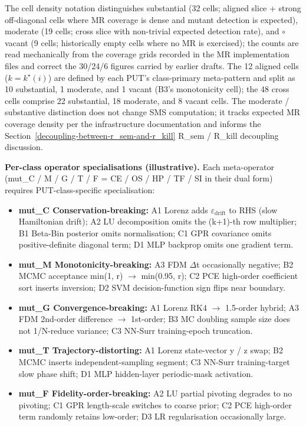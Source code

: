 \documentclass[review,12pt,authoryear]{elsarticle}
\providecommand{\tightlist}{\setlength{\itemsep}{0pt}\setlength{\parskip}{0pt}}
\begin{document}
The cell density notation distinguishes \textbullet\textbullet substantial (32 cells;
aligned slice + strong off-diagonal cells where MR coverage is dense and
mutant detection is expected), \textbullet moderate (19 cells; cross slice with
non-trivial expected detection rate), and $\circ$ vacant (9 cells;
historically empty cells where no MR is exercised); the counts are
read mechanically from the coverage grids recorded in the MR
implementation files and correct the 30/24/6 figures carried by
earlier drafts. The 12
aligned cells ($k = k^\star(i)$) are defined by each PUT's class-primary
meta-pattern and split as 10 substantial, 1 moderate, and 1 vacant
(B3's monotonicity cell); the 48 cross
cells comprise 22 substantial, 18 moderate, and 8
vacant cells. The \textbullet moderate / \textbullet\textbullet substantive
distinction does not change SMS computation; it tracks expected MR
coverage density per the infrastructure documentation and informs the Section~\ref{decoupling-between-r_sem-and-r_kill} R\_sem /
R\_kill decoupling discussion.

\textbf{Per-class operator specialisations (illustrative).} Each
meta-operator (mut\_C / M / G / T / F = CE / OS / HP / TF / SI in their
dual form) requires PUT-class-specific specialisation:

\begin{itemize}
\tightlist
\item
  \textbf{mut\_C Conservation-breaking:} A1 Lorenz adds $\varepsilon_{\mathrm{drift}}$ to RHS
  (slow Hamiltonian drift); A2 LU decomposition omits the (k+1)-th row
  multiplier; B1 Beta-Bin posterior omits normalisation; C1 GPR
  covariance omits positive-definite diagonal term; D1 MLP backprop
  omits one gradient term.
\item
  \textbf{mut\_M Monotonicity-breaking:} A3 FDM $\Delta$t occasionally
  negative; B2 MCMC acceptance min(1, r) $\to$ min(0.95, r); C2 PCE
  high-order coefficient sort inserts inversion; D2 SVM
  decision-function sign flips near boundary.
\item
  \textbf{mut\_G Convergence-breaking:} A1 Lorenz RK4 $\to$ 1.5-order
  hybrid; A3 FDM 2nd-order difference $\to$ 1st-order; B3 MC doubling sample
  size does not 1/N-reduce variance; C3 NN-Surr training-epoch
  truncation.
\item
  \textbf{mut\_T Trajectory-distorting:} A1 Lorenz state-vector y / z
  swap; B2 MCMC inserts independent-sampling segment; C3 NN-Surr
  training-target slow phase shift; D1 MLP hidden-layer periodic-mask
  activation.
\item
  \textbf{mut\_F Fidelity-order-breaking:} A2 LU partial pivoting
  degrades to no pivoting; C1 GPR length-scale switches to coarse prior;
  C2 PCE high-order term randomly retains low-order; D3 LR
  regularisation occasionally large.
\end{itemize}
\end{document}
